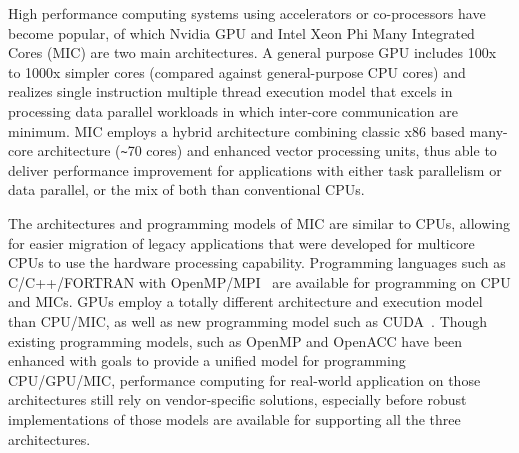   High performance computing systems using accelerators or co-processors have become popular, of which Nvidia GPU and 
Intel Xeon Phi Many Integrated Cores (MIC) are two main architectures.  
A general purpose GPU includes 100x to 1000x simpler cores (compared against general-purpose CPU cores) 
and realizes single instruction multiple thread execution model 
that excels in processing data parallel workloads in which inter-core
communication are minimum. 
MIC employs a hybrid architecture combining classic x86 based many-core architecture (\verb#~#70 cores) 
and enhanced vector processing units, thus able to deliver performance improvement for applications with either task parallelism or data parallel, or
the mix of both than conventional CPUs.  

The architectures and programming models of MIC are similar to CPUs,
allowing for easier migration of legacy applications that were developed for multicore CPUs
to use the hardware processing capability. Programming languages such as C/C++/FORTRAN with OpenMP/MPI~\cite{R:6,R:20} are available for programming
on CPU and MICs. 
GPUs employ a totally different architecture and execution model than CPU/MIC, as well as new programming model such as CUDA~\cite{R:21}. Though 
existing programming models, such as OpenMP and OpenACC have been enhanced with goals to provide 
a unified model for programming CPU/GPU/MIC, performance
computing for real-world application on those architectures still rely on vendor-specific solutions, especially before robust implementations of 
those models are available for supporting all the three architectures. 

 
   


